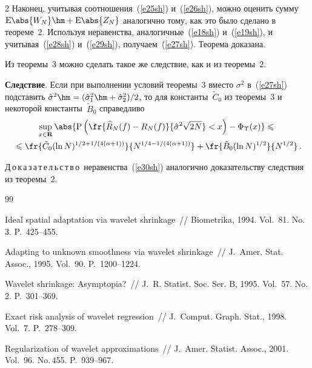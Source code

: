 \begin{multicols}{2}
Наконец, учитывая соотношения~(\ref{e25sh}) и~(\ref{e26sh}), можно оценить сумму 
$\mbox{E}\abs{W_N}\hm+\mbox{E}\abs{Z_N}$ аналогично тому, как 
это было сделано в тео\-ре\-ме~2. Используя неравенства, аналогичные~(\ref{e18sh}) и~(\ref{e19sh}),
 и учитывая~(\ref{e28sh}) и~(\ref{e29sh}), получаем~(\ref{e27sh}). Теорема доказана.
 
 \medskip

Из теоремы~3 можно сделать такое же следствие, как и из теоремы~2.

\medskip

\noindent
\textbf{Следствие}. Если при выполнении условий теоремы~3 
вместо $\sigma^2$ в~(\ref{e27sh}) 
подставить $\hat{\sigma}^2\hm=(\hat{\sigma}_1^2\hm+\hat{\sigma}_2^2)/2$, то для 
константы~$\tilde{C}_0$ из теоремы~3 и некоторой константы~$\tilde{B}_0$ справедливо
\begin{multline}
\sup\limits_{x\in\mathbf{R}}\abs{\mbox{P}\left(
\fr{\widehat{R}_N(f)-R_N(f)}{\hat{\sigma}^2\sqrt{2N}}<x\right)-
\Phi_{\Upsilon}(x)}\leqslant{}\\
{}\leqslant
\fr{\tilde{C}_0(\ln N)^{{1}/{2}+{1}/(4(\alpha+1))}}
{N^{{1}/{4}-{1}/(4(\alpha+1))}}+\fr{\tilde{B}_0(\ln N)^{{1}/{2}}}{N^{{1}/{2}}}\,.\label{e30sh}
\end{multline}

\noindent
Д\,о\,к\,а\,з\,а\,т\,е\,л\,ь\,с\,т\,в\,о\ неравенства~(\ref{e30sh}) аналогично доказательству следствия из теоремы~2.


{\small\frenchspacing
{%
\begin{thebibliography}{99}

 Ideal spatial adaptation via
wavelet shrinkage~// Biometrika, 1994. Vol.~81. No.\,3. P.~425--455.


 Adapting to unknown
smoothness via wavelet shrinkage~// J.~Amer. Stat. Assoc., 1995.
Vol.~90. P.~1200--1224.


Wavelet shrinkage: Asymp\-to\-pia?~// J.~R. Statist. Soc. Ser. B,
1995. Vol.~57. No.\,2. P.~301--369.

 Exact risk analysis of wavelet regression~// J.~Comput.
Graph. Stat., 1998. Vol.~7. P.~278--309.

 Regularization of wavelet approximations~// 
J.~Amer. Statist. Assoc., 2001. Vol.~96. No.\,455. P.~939--967.


\end{thebibliography}}}
\end{multicols}
